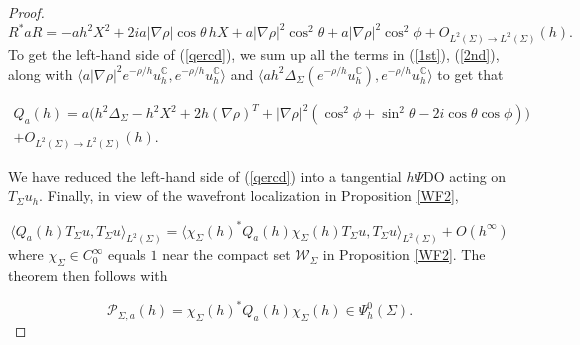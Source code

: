 \documentclass[11pt,reqno]{amsart}
\newcommand{\C}{{\mathbb C}}
\theoremstyle{definition}
\begin{document}
\begin{proof}
\begin{equation}\label{2nd}
R^*aR=-ah^2X^2+2ia|\nabla\rho|\cos\theta \, hX+a|\nabla\rho|^2\cos^2\theta+a|\nabla\rho|^2\cos^2\phi + O_{L^2(\Sigma) \to L^2(\Sigma)}(h).  \end{equation}
To get the left-hand side of (\ref{qercd}), we sum up all the terms in (\ref{1st}), (\ref{2nd}),  along with  $ \langle a|\nabla\rho|^2 e^{-\rho/h} u_h^{\C}, e^{-\rho/h} u_h^{\C} \rangle$ and $\langle a h^2\Delta_{\Sigma}(e^{-\rho/h}u_h^{\C}),e^{-\rho/h}u_h^{\C}\rangle$ to get that

\begin{eqnarray}\label{explicit}
  Q_a(h) = a\Big(h^2\Delta_{\Sigma}-h^2X^2+2h(\nabla\rho)^{T}+|\nabla\rho|^2(\cos^2\phi+\sin^2\theta-2i\cos\theta\cos\phi)\Big) \\ \nonumber 
    +  O_{L^2(\Sigma) \to L^2(\Sigma)}(h). 
\end{eqnarray}

We have reduced the left-hand side of (\ref{qercd}) into a tangential $h\Psi$DO acting on $T_{\Sigma}u_h$. Finally, in view of the wavefront localization in Proposition  \ref{WF2},

$$
\langle Q_a(h) T_\Sigma u, T_\Sigma u \rangle_{L^2(\Sigma)} = \langle \chi_\Sigma(h)^* Q_a(h) \chi_{\Sigma}(h) T_\Sigma u, T_\Sigma u \rangle_{L^2(\Sigma)} + O(h^\infty)
$$
where $\chi_{\Sigma} \in C^{\infty}_0$ equals $1$ near the compact set ${\mathcal W}_{\Sigma}$ in Proposition \ref{WF2}. The theorem then follows with

\begin{equation} \label{test op}
{\mathcal P}_{\Sigma, a}(h) =  \chi_\Sigma(h)^* Q_a(h) \chi_{\Sigma}(h) \in \Psi_h^0(\Sigma).
\end{equation}

\end{proof}
\end{document}
